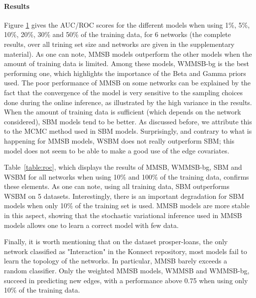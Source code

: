 \begin{figure}[h]
\centering
	
   \label{fig:roc}
\end{figure}

\paragraph{Results} Figure \ref{fig:roc} gives the AUC/ROC scores for the different models when using 1\%, 5\%, 10\%, 20\%, 30\% and 50\% of the training data, for 6 networks (the complete results, over all trining set size and networks are given in the supplementary material). As one can note, MMSB models outperform the other models when the amount of training data is limited. Among these models, WMMSB-bg is the best performing one, which highlights the importance of the Beta and Gamma priors used. The poor performance of MMSB on some networks can be explained by the fact that the convergence of the model is very sensitive to the sampling choices done during the online inference, as illustrated by the high variance in the results. When the amount of training data is sufficient (which depends on the network considered), SBM models tend to be better. As discussed before, we attribute this to the MCMC method used in SBM models. Surprisingly, and contrary to what is happening for MMSB models, WSBM does not really outperform SBM; this model does not seem to be able to make a good use of the edge covariates. 

Table~\ref{table:roc}, which displays the results of MMSB, WMMSB-bg, SBM and WSBM for all networks when using 10\% and 100\% of the training data, confirms these elements. As one can note, using all training data, SBM outperforms WSBM on 5 datasets. Interestingly, there is an important degradation for SBM models when only 10\% of the training set is used. MMSB models are more stable in this aspect, showing that the stochastic variational inference used in MMSB models allows one to learn a correct model with few data.

Finally, it is worth mentioning that on the dataset prosper-loans, the only network classified as "Interaction" in the Konnect repository, most models fail to learn the topology of the networks. In particular, MMSB barely exceeds a random classifier. Only the weighted MMSB models, WMMSB and WMMSB-bg, succeed in predicting new edges, with a performance above 0.75 when using only 10\% of the training data.
 
